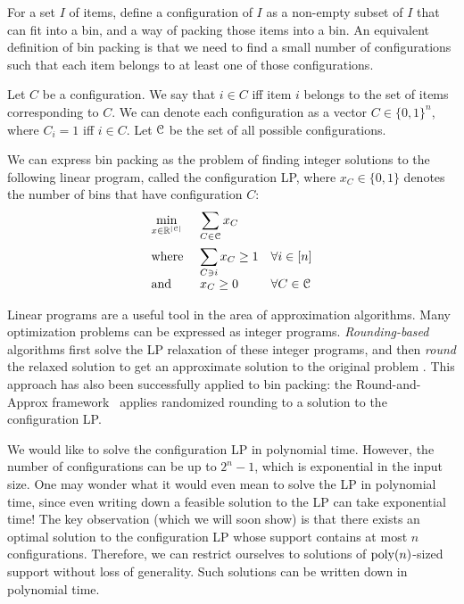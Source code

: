 For a set $I$ of items, define a configuration of $I$ as a non-empty subset of $I$
that can fit into a bin, and a way of packing those items into a bin.
An equivalent definition of bin packing is that we need to find
a small number of configurations such that each item belongs to
at least one of those configurations.

Let $C$ be a configuration. We say that $i \in C$ iff
item $i$ belongs to the set of items corresponding to $C$.
We can denote each configuration as a vector $C \in \{0, 1\}^n$,
where $C_i = 1$ iff $i \in C$.
Let $\mathcal{C}$ be the set of all possible configurations.

We can express bin packing as the problem of finding integer solutions
to the following linear program, called the configuration LP,
where $x_C \in \{0, 1\}$ denotes the number of bins that have configuration $C$:
\[ \begin{array}{*3{>{\displaystyle}l}}
\min_{x \in \mathbb{R}^{|\Ccal|}} & \multicolumn{2}{>{\displaystyle}l}{\sum_{C \in \Ccal} x_C}
\\[1.5em] \textrm{where } & \sum_{C \ni i} x_C \ge 1 & \forall i \in [n]
\\[1em] \textrm{and } & x_C \ge 0 & \forall C \in \Ccal
\end{array} \]

Linear programs are a useful tool in the area of approximation algorithms.
Many optimization problems can be expressed as integer programs.
\emph{Rounding-based} algorithms first solve the LP relaxation of these integer programs,
and then \emph{round} the relaxed solution to get an approximate solution to the original problem
\cite{daa:det-lp-round,daa:rand-lp-round,iterative-methods}.
This approach has also been successfully applied to bin packing:
the Round-and-Approx framework~\cite{rna,bansal2014binpacking}
applies randomized rounding to a solution to the configuration LP.

We would like to solve the configuration LP in polynomial time.
However, the number of configurations can be up to $2^n-1$,
which is exponential in the input size.
One may wonder what it would even mean to solve the LP in polynomial time,
since even writing down a feasible solution to the LP can take exponential time!
The key observation (which we will soon show) is that
there exists an optimal solution to the configuration LP
whose support contains at most $n$ configurations.
Therefore, we can restrict ourselves to solutions of $\operatorname{poly}(n)$-sized support
without loss of generality. Such solutions can be written down in polynomial time.

